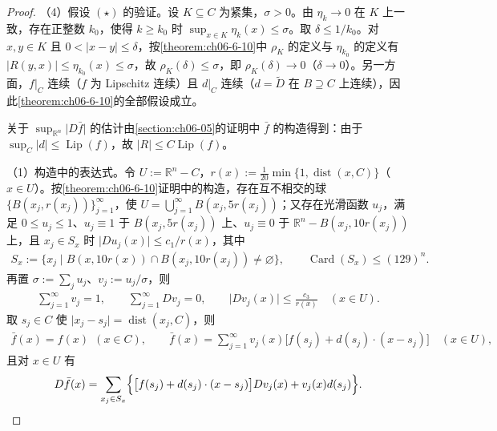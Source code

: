 \documentclass[../../main.tex]{subfiles}%
\begin{document}
\begin{proof}
（4）假设 $(\star)$ 的验证。设 $K\subseteq C$ 为紧集，$\sigma>0$。由 $\eta_k\to0$ 在 $K$ 上一致，存在正整数 $k_0$，使得 $k\ge k_0$ 时 $\sup_{x\in K}\eta_k(x)\le\sigma$。取 $\delta\le1/k_0$。对 $x,y\in K$ 且 $0<\lvert x-y\rvert\le\delta$，按\cref{theorem:ch06-6-10}中 $\rho_K$ 的定义与 $\eta_{k_0}$ 的定义有 $\lvert R(y,x)\rvert\le\eta_{k_0}(x)\le\sigma$，故 $\rho_K(\delta)\le\sigma$，即 $\rho_K(\delta)\to0$（$\delta\to0$）。另一方面，$f|_C$ 连续（$f$ 为 Lipschitz 连续）且 $d|_C$ 连续（$d=\tilde D$ 在 $B\supseteq C$ 上连续），因此\cref{theorem:ch06-6-10}的全部假设成立。%

关于 $\sup_{\mathbb{R}^n}\lvert D\bar f\rvert$ 的估计由\cref{section:ch06-05}的证明中 $\bar f$ 的构造得到：由于 $\sup_C\lvert d\rvert\le\operatorname{Lip}(f)$，故 $\lvert R\rvert\le C\operatorname{Lip}(f)$。%

（1）构造中的表达式。令 $U:=\mathbb{R}^n-C$，$r(x):=\frac{1}{20}\min\{1,\operatorname{dist}(x,C)\}$（$x\in U$）。按\cref{theorem:ch06-6-10}证明中的构造，存在互不相交的球 $\{B(x_j,r(x_j))\}_{j=1}^{\infty}$，使 $U=\bigcup_{j=1}^{\infty}B(x_j,5r(x_j))$；又存在光滑函数 $u_j$，满足 $0\le u_j\le1$、$u_j\equiv1$ 于 $B(x_j,5r(x_j))$ 上、$u_j\equiv0$ 于 $\mathbb{R}^n-B(x_j,10r(x_j))$ 上，且 $x_j\in S_x$ 时 $\lvert Du_j(x)\rvert\le c_1/r(x)$，其中%
\begin{align*}
S_x:=\bigl\{x_j\mid B(x,10r(x))\cap B(x_j,10r(x_j))\ne\varnothing\bigr\},\qquad\operatorname{Card}(S_x)\le(129)^n .
\end{align*}
再置 $\sigma:=\sum_ju_j$、$v_j:=u_j/\sigma$，则
\begin{align*}
\sum_{j=1}^{\infty}v_j=1,\qquad\sum_{j=1}^{\infty}Dv_j=0,\qquad\lvert Dv_j(x)\rvert\le\frac{c_3}{r(x)}\quad(x\in U).
\end{align*}
取 $s_j\in C$ 使 $\lvert x_j-s_j\rvert=\operatorname{dist}(x_j,C)$，则
\begin{align*}
\bar f(x)=f(x)\ \ (x\in C),\qquad\bar f(x)=\sum_{j=1}^{\infty}v_j(x)\bigl[f(s_j)+d(s_j)\cdot(x-s_j)\bigr]\quad(x\in U),
\end{align*}
且对 $x\in U$ 有
\begin{align*}
D\bar f(x)=\sum_{x_j\in S_x}\Bigl\{\bigl[f(s_j)+d(s_j)\cdot(x-s_j)\bigr]Dv_j(x)+v_j(x)d(s_j)\Bigr\}.
\end{align*}


\end{proof}
\end{document}
